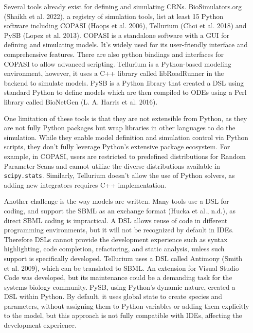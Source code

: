 \documentclass[
  letterpaper,
  DIV=11,
  numbers=noendperiod]{scrartcl}
\begin{document}
Several tools already exist for defining and simulating \acp{CRN}.
BioSimulators.org (Shaikh et al. 2022), a registry of simulation tools,
list at least 15 Python software including COPASI (Hoops et al. 2006),
Tellurium (Choi et al. 2018) and PySB (Lopez et al. 2013). COPASI is a
standalone software with a \ac{GUI} for defining and simulating models. It's
widely used for its user-friendly interface and comprehensive features.
There are also python bindings and interfaces for COPASI to allow
advanced scripting. Tellurium is a Python-based modeling environment,
however, it uses a C++ library called libRoadRunner in the backend to
simulate models. PySB is a Python library that created a \ac{DSL} using
standard Python to define models which are then compiled to \acp{ODE} using a
Perl library called BioNetGen (L. A. Harris et al. 2016).

One limitation of these tools is that they are not extensible from
Python, as they are not fully Python packages but wrap libraries in
other languages to do the simulation. While they enable model definition
and simulation control via Python scripts, they don't fully leverage
Python's extensive package ecosystem. For example, in COPASI, users are
restricted to predefined distributions for Random Parameter Scans and
cannot utilize the diverse distributions available in
\texttt{scipy.stats}. Similarly, Tellurium doesn't allow the use of
Python solvers, as adding new integrators requires C++ implementation.



Another challenge is the way models are written. Many tools use a \ac{DSL} for coding, and support the
\ac{SBML} as an exchange format (Hucka et al., n.d.), as
direct \ac{SBML} coding is impractical. A \ac{DSL} allows reuse of code in
different programming environments, but it will not be recognized by
default in \acp{IDE}. Therefore \acp{DSL}
cannot provide the development experience such as syntax highlighting,
code completion, refactoring, and static analysis, unless such support
is specifically developed. Tellurium uses a
\ac{DSL} called Antimony (Smith et al. 2009), which can be translated to
\ac{SBML}. An extension for Visual Studio Code was developed, but its
maintenance could be a demanding task for the systems biology community.
PySB, using Python's dynamic nature, created a \ac{DSL} within Python. By
default, it uses global state to create species and parameters, without
assigning them to Python variables or adding them explicitly to the
model, but this approach is not fully compatible with \acp{IDE}, affecting
the development experience.
\end{document}
